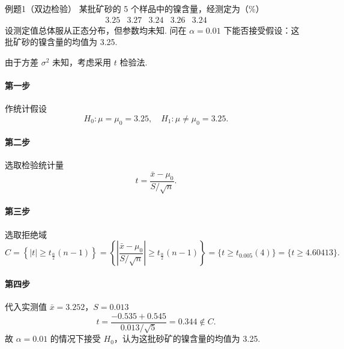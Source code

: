 \begin{question}{例题1（双边检验）}
    某批矿砂的 5 个样品中的镍含量，经测定为（\%）
    $$
        \begin{array}{ccccc}
            3.25 & 3.27 & 3.24 & 3.26 & 3.24
        \end{array}
    $$
    设测定值总体服从正态分布，但参数均未知. 问在 $\alpha=0.01$ 下能否接受假设：这批矿砂的镍含量的均值为 3.25.
\end{question}
\begin{solution}
    由于方差 $\sigma^2$ 未知，考虑采用 $t$ 检验法.
    \paragraph{第一步} 作统计假设
    $$
        H_0: \mu=\mu_0=3.25, \quad H_1: \mu \neq \mu_0=3.25.
    $$
    \paragraph{第二步} 选取检验统计量
    $$
        t = \frac{\bar{x}-\mu_0}{S/\sqrt{n}} .
    $$
    \paragraph{第三步} 选取拒绝域
    $$
        C = \left\{|t| \geqslant t_{\frac{\alpha}{2}}(n-1)\right\}
        = \left\{\left|\frac{\bar{x}-\mu_0}{S/\sqrt{n}}\right| \geqslant t_{\frac{\alpha}{2}}(n-1)\right\}
        = \{t \geqslant t_{0.005}(4)\}
        = \{t \geqslant 4.60413\}.
    $$
    \paragraph{第四步} 代入实测值 $\bar{x}=3.252$，$S=0.013$
    $$
        t = \frac{-0.535+0.545}{0.013/\sqrt{5}} = 0.344 \notin C.
    $$
    故 $\alpha = 0.01$ 的情况下接受 $H_0$，认为这批砂矿的镍含量的均值为 3.25.
\end{solution}



